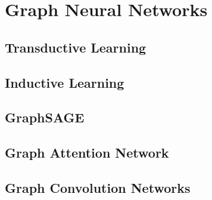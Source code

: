
\chapter{Graph Neural Networks}
	
	\section{Transductive Learning}
	
	
	\section{Inductive Learning}
	
	
	\section{GraphSAGE}
	
	
	\section{Graph Attention Network}
	
	
	\section{Graph Convolution Networks}
	